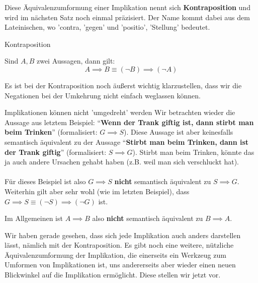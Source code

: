 \documentclass[../../main.tex]{subfiles}
\newcommand{\statement}[1]{\textrm{\enquote{\textbf{#1}}}}
\begin{document}
    Diese Äquivalenzumformung einer Implikation nennt sich \textbf{Kontraposition} 
    und wird im nächsten Satz noch einmal präzisiert.  Der Name kommt dabei aus dem Lateinischen, wo 'contra, 'gegen'
    und 'positio', 'Stellung' bedeutet. 
    
    \begin{lemma}{Kontraposition}

    Sind $A,B$ zwei Aussagen, dann gilt:
        \[A \implies B  \equiv (\lnot B) \implies (\lnot A)\]
    \end{lemma}

    Es ist bei der Kontraposition noch äußerst wichtig klarzustellen, dass wir die Negationen bei der Umkehrung
    nicht einfach weglassen können. 

    \begin{example}{Implikationen können nicht 'umgedreht' werden}
        Wir betrachten wieder die Aussage aus letztem Beispiel: \statement{Wenn der Trank giftig ist, 
        dann stirbt man beim Trinken} (formalisiert: $G \implies S$). Diese Aussage ist aber 
        keinesfalls semantisch äquivalent zu der 
        Aussage \statement{Stirbt man beim Trinken, dann ist der Trank giftig} (formalisiert: $S \implies G$).
        Stirbt man beim Trinken, könnte das ja auch andere Ursachen gehabt haben (z.B. weil man sich verschluckt hat).
        \\ \\
        Für dieses Beispiel ist also $G \implies S$ \textbf{nicht} semantisch äquivalent zu $S \implies G$.
        Weiterhin gilt aber sehr wohl (wie im letzten Beispiel), 
        dass $G \implies S \equiv (\lnot S) \implies (\lnot G)$ ist.

    \end{example}

    Im Allgemeinen ist $A \implies B$ also \textbf{nicht} semantisch äquivalent zu $B \implies A$.

    Wir haben gerade gesehen, dass sich jede Implikation auch anders darstellen lässt, 
    nämlich mit der Kontraposition. Es gibt noch eine weitere, nützliche Äquivalenzumformung 
    der Implikation, die einerseits ein Werkzeug zum Umformen von Implikationen ist, uns
    andererseits aber wieder einen neuen Blickwinkel auf die Implikation ermöglicht.
    Diese stellen wir jetzt vor.
    
\end{document}
